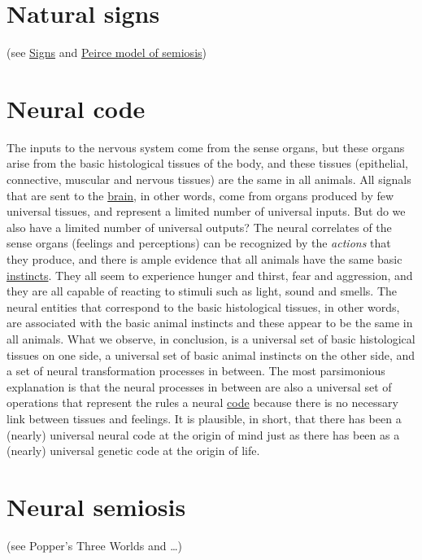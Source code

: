 \documentclass[12pt]{article}
\begin{document}
\hypertarget{natural_signs}{}
\section{Natural signs} 

(see \hyperlink{signs}{Signs} and \hyperlink{peirce_model_of_semiosis}{Peirce model of semiosis}) 


\hypertarget{neural_code}{}
\section{Neural code}
The inputs to the nervous system come from the sense organs, but these organs arise from the basic histological tissues of the body, and these tissues (epithelial, connective, muscular and nervous tissues) are the same in all animals. All signals that are sent to the \hyperlink{brain}{brain}, in other words, come from organs produced by few universal tissues, and represent a limited number of universal inputs. But do we also have a limited number of universal outputs? The neural correlates of the sense organs (feelings and perceptions) can be recognized by the \textit{actions} that they produce, and there is ample evidence that all animals have the same basic \hyperlink{instinctive_brain}{instincts}. They all seem to experience hunger and thirst, fear and aggression, and they are all capable of reacting to stimuli such as light, sound and smells. The neural entities that correspond to the basic histological tissues, in other words, are associated with the basic animal instincts and these appear to be the same in all animals. What we observe, in conclusion, is a universal set of basic histological tissues on one side, a universal set of basic animal instincts on the other side, and a set of neural transformation processes in between. The most parsimonious explanation is that the neural processes in between are also a universal set of operations that represent the rules a neural \hyperlink{code}{code} because there is no necessary link between tissues and feelings. It is plausible, in short, that there has been a (nearly) universal neural code at the origin of mind just as there has been as a (nearly) universal genetic code at the origin of life. 


\hypertarget{neural_semiosis}{}
\section{Neural semiosis} (see Popper's Three Worlds and …)	 
\end{document}
